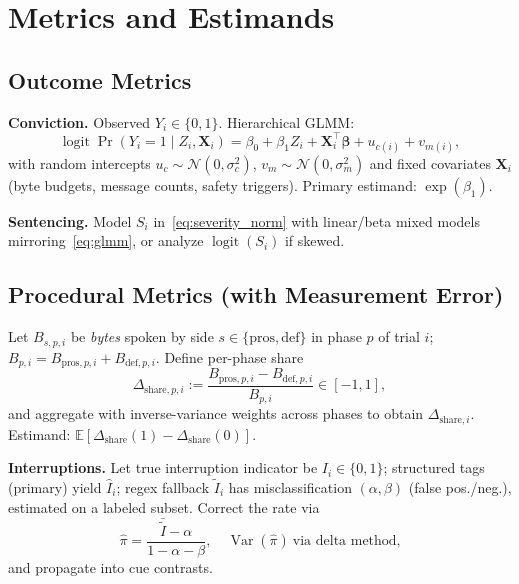 \documentclass[conference]{IEEEtran}
\begin{document}
\section{Metrics and Estimands}

\subsection{Outcome Metrics}
\label{sec:outcomes}
\textbf{Conviction.} Observed $Y_i\in\{0,1\}$. Hierarchical GLMM:
\begin{equation}
\label{eq:glmm}
\operatorname{logit}\Pr(Y_i{=}1\mid Z_i,\bm{X}_i) =
\beta_0 + \beta_1 Z_i + \bm{X}_i^\top\bm{\beta} + u_{c(i)} + v_{m(i)},
\end{equation}
with random intercepts $u_c\sim\mathcal{N}(0,\sigma_c^2)$, $v_m\sim\mathcal{N}(0,\sigma_m^2)$ and fixed covariates $\bm{X}_i$ (byte budgets, message counts, safety triggers). Primary estimand: $\exp(\beta_1)$.

\textbf{Sentencing.} Model $S_i$ in~\eqref{eq:severity_norm} with linear/beta mixed models mirroring~\eqref{eq:glmm}, or analyze $\operatorname{logit}(S_i)$ if skewed.

\subsection{Procedural Metrics (with Measurement Error)}
Let $B_{s,p,i}$ be \emph{bytes} spoken by side $s\in\{\text{pros},\text{def}\}$ in phase $p$ of trial $i$; $B_{p,i}=B_{\text{pros},p,i}+B_{\text{def},p,i}$. Define per-phase share
\begin{equation}
\Delta_{\text{share},p,i} := \frac{B_{\text{pros},p,i}-B_{\text{def},p,i}}{B_{p,i}} \in [-1,1] ,
\label{eq:share}
\end{equation}
and aggregate with inverse-variance weights across phases to obtain $\Delta_{\text{share},i}$. Estimand: $\mathbb{E}[\Delta_{\text{share}}(1)-\Delta_{\text{share}}(0)]$.

\textbf{Interruptions.} Let true interruption indicator be $I_i\in\{0,1\}$; structured tags (primary) yield $\widehat{I}_i$; regex fallback $\widetilde{I}_i$ has misclassification $(\alpha,\beta)$ (false pos./neg.), estimated on a labeled subset. Correct the rate via
\begin{equation}
\widehat{\pi} = \frac{\bar{\widetilde{I}} - \alpha}{1 - \alpha - \beta}, \quad
\operatorname{Var}(\widehat{\pi}) \ \text{via delta method,}
\label{eq:me_correction}
\end{equation}
and propagate into cue contrasts.
\end{document}
